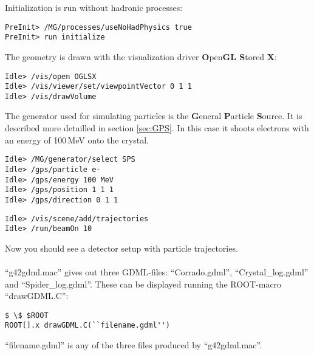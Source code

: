 Initialization is run without hadronic processes:
\begin{lstlisting}
PreInit> /MG/processes/useNoHadPhysics true 
PreInit> run initialize
\end{lstlisting}
The geometry is drawn with the visualization driver \textbf{O}pen\textbf{GL S}tored \textbf{X}:
\begin{lstlisting}
Idle> /vis/open OGLSX
Idle> /vis/viewer/set/viewpointVector 0 1 1
Idle> /vis/drawVolume
\end{lstlisting}
The generator used for simulating particles is the \textbf{G}eneral \textbf{P}article \textbf{S}ource. It is described more detailled in section \ref{sec:GPS}. In this case it shoots electrons with an energy of 100\,MeV onto the crystal.
\begin{lstlisting}
Idle> /MG/generator/select SPS
Idle> /gps/particle e-
Idle> /gps/energy 100 MeV
Idle> /gps/position 1 1 1
Idle> /gps/direction 0 1 1
\end{lstlisting}

\begin{lstlisting}
Idle> /vis/scene/add/trajectories
Idle> /run/beamOn 10
\end{lstlisting}
Now you should see a detector setup with particle trajectories.\\
\vspace{5mm}\\
``g42gdml.mac'' gives out three GDML-files: ``Corrado.gdml'', ``Crystal\_log.gdml'' and ``Spider\_log.gdml''. These can be displayed running the ROOT-macro ``drawGDML.C'':
\begin{lstlisting}
$ \$ $ROOT
ROOT[].x drawGDML.C(``filename.gdml'')
\end{lstlisting}
``filename.gdml'' is any of the three files produced by ``g42gdml.mac''.\\

